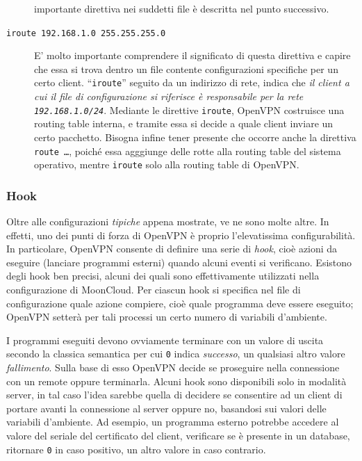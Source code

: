 \begin{description}
	importante direttiva nei suddetti file è descritta nel punto successivo.
	\item[\texttt{iroute 192.168.1.0 255.255.255.0}]E' molto importante comprendere
	il significato di questa direttiva e capire che essa si trova dentro un file
	contente configurazioni specifiche per un certo client. ``\texttt{iroute}'' seguito
	da un indirizzo di rete, indica che \textit{il client a cui il file di configurazione
		si riferisce è responsabile per la rete \texttt{192.168.1.0/24}}. Mediante le
	direttive \texttt{iroute}, OpenVPN costruisce una routing table interna,
	e tramite essa si
	decide a quale client inviare un certo pacchetto. Bisogna infine tener presente
	che occorre anche la direttiva \texttt{route \ldots}, poiché essa agggiunge delle
	rotte alla routing table del sistema operativo, mentre \texttt{iroute} solo
	alla routing table di OpenVPN.
\end{description}

\subsubsection{Hook}
Oltre alle configurazioni \textit{tipiche} appena mostrate, ve ne sono molte altre. In effetti,
uno dei punti di forza di OpenVPN è proprio l'elevatissima configurabilità.
In particolare, OpenVPN consente di definire una serie di \textit{hook},
cioè azioni da eseguire (lanciare programmi esterni) quando alcuni eventi si verificano.
Esistono degli hook ben precisi, alcuni dei quali sono effettivamente utilizzati
nella configurazione di MoonCloud. Per ciascun hook si specifica nel file di configurazione
quale azione compiere, cioè quale programma deve essere eseguito;
OpenVPN setterà per tali processi un certo numero di variabili d'ambiente.

I programmi eseguiti devono ovviamente terminare con un valore di uscita secondo
la classica semantica per cui \texttt{0} indica \textit{successo}, un qualsiasi
altro valore \textit{fallimento}. Sulla base
di esso OpenVPN decide se proseguire nella connessione con un remote oppure terminarla.
Alcuni hook sono disponibili solo in modalità server, in tal caso
l'idea sarebbe quella di decidere se consentire ad un client di portare avanti
la connessione al server oppure no, basandosi sui valori delle variabili d'ambiente.
Ad esempio, un programma esterno potrebbe accedere al valore del seriale del certificato
del client, verificare se è presente in un database, ritornare \texttt{0} in caso
positivo, un altro valore in caso contrario.

